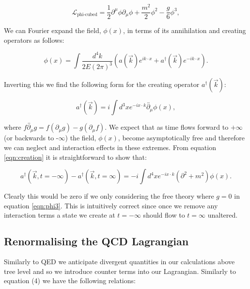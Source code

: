 	\begin{equation}
		\mathcal{L}_{\text{phi-cubed}} = \frac{1}{2}\partial^{\mu}\phi\partial_{\mu}\phi + \frac{m^2}{2}\phi^2 - \frac{g}{6}\phi^3,
		\label{eqn:phi3}
	\end{equation}

	We can Fourier expand the field, $\phi(x)$, in terms of its annihilation and creating operators as follows:

	\begin{equation}
		\phi(x) = \int\frac{d^4k}{2E(2\pi)^3}\left(a(\vec{k})e^{ik\cdot x} + a^\dagger(\vec{k})e^{-ik\cdot x}\right).
	\end{equation}

	Inverting this we find the following form for the creating operator $a^\dagger(\vec{k})$:

	\begin{equation}
		a^\dagger(\vec{k}) = i\int d^3xe^{-ix\cdot k} \overleftrightarrow{\partial_\mu}\phi(x),
		\label{eqn:creation}
	\end{equation}

	where $f\overleftrightarrow{\partial_\mu} g = f(\partial_\mu g) - g(\partial_\mu f)$.  We expect that as time flows forward to
	$+\infty$ (or backwards to -$\infty$) the field, $\phi(x)$, become asymptotically free and therefore we can neglect and
	interaction effects in these extremes.  From equation \eqref{eqn:creation} it is straightforward to show that:

	\begin{equation}
		a^\dagger(\vec{k}, t=-\infty) - a^\dagger(\vec{k}, t=\infty) = - i\int d^4x e^{-ix\cdot k}(\partial^2 + m^2)\phi(x).
	\end{equation}

	Clearly this would be zero if we only considering the free theory where $g=0$ in equation \eqref{eqn:phi3}.  This is intuitively correct
	since once we remove any interaction terms a state we create at $t=-\infty$ should flow to $t=\infty$ unaltered.

	\subsection{Renormalising the QCD Lagrangian}

	Similarly to QED we anticipate divergent quantities in our calculations above tree level and
	so we introduce counter terms into our Lagrangian.  Similarly to equation (4) we have the following relations:

